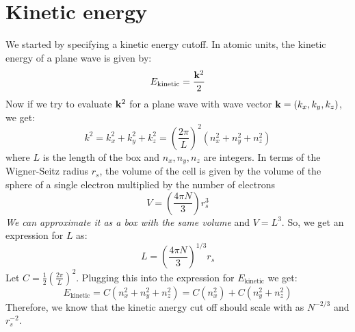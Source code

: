 \documentclass[12pt]{article}
\begin{document}
\section{Kinetic energy}

We started by specifying a kinetic energy cutoff. In atomic units, the kinetic energy of a plane wave is given by:
\begin{equation}
    E_{\text{kinetic}} = \frac{\vb{k}^2}{2}
\end{equation}
Now if we try to evaluate $\vb{k}^2$ for a plane wave with wave vector $\vb{k} = (k_x, k_y, k_z)$, we get:
\begin{equation}
    k^2 = k_x^2 + k_y^2 + k_z^2 =  \left(\frac{2\pi}{L}\right)^2 \left(n_x^2 + n_y^2 + n_z^2\right)
\end{equation}
where \( L \) is the length of the box and \( n_x, n_y, n_z \) are integers. In terms of the Wigner-Seitz radius \( r_s \), the volume of the cell is given by the volume of the sphere of a single electron multiplied by the number of electrons
\begin{equation}
    V = \left(\frac{4\pi N}{3}\right) r_s^3
\end{equation}
\emph{We can approximate it as a box with the same volume} and \( V= L^3 \). So, we get an expression for \( L \) as:
\begin{equation}
    L = \left( \frac{4\pi N}{3} \right)^{1/3} r_s
\end{equation}
Let $C = \frac{1}{2}\left(\frac{2 \pi}{L}\right)^2$.
Plugging this into the expression for $E_{\text{kinetic}}$ we get:
\begin{equation}
    E_{\text{kinetic}} = C \left(n_x^2 + n_y^2 + n_z^2\right) = C \left(n_x^2\right) + C \left(n_y^2 + n_z^2\right)
\end{equation}
Therefore, we know that the kinetic anergy cut off should scale with as $N^{-2/3}$ and $r_s^{-2}$.
\end{document}

